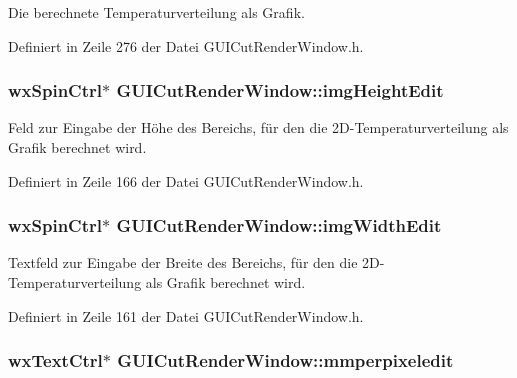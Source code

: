 Die berechnete Temperaturverteilung als Grafik. 



Definiert in Zeile 276 der Datei G\-U\-I\-Cut\-Render\-Window.\-h.

\hypertarget{classGUICutRenderWindow_a4daa569840f00756e6781ad2d87aef5b}{
\subsubsection[{img\-Height\-Edit}]{\setlength{\rightskip}{0pt plus 5cm}wx\-Spin\-Ctrl$\ast$ G\-U\-I\-Cut\-Render\-Window\-::img\-Height\-Edit\hspace{0.3cm}{\ttfamily [private]}}}\label{classGUICutRenderWindow_a4daa569840f00756e6781ad2d87aef5b}


Feld zur Eingabe der Höhe des Bereichs, für den die 2\-D-\/\-Temperaturverteilung als Grafik berechnet wird. 



Definiert in Zeile 166 der Datei G\-U\-I\-Cut\-Render\-Window.\-h.

\hypertarget{classGUICutRenderWindow_a211043ba4bd60862a9fbfe1186c40875}{
\subsubsection[{img\-Width\-Edit}]{\setlength{\rightskip}{0pt plus 5cm}wx\-Spin\-Ctrl$\ast$ G\-U\-I\-Cut\-Render\-Window\-::img\-Width\-Edit\hspace{0.3cm}{\ttfamily [private]}}}\label{classGUICutRenderWindow_a211043ba4bd60862a9fbfe1186c40875}


Textfeld zur Eingabe der Breite des Bereichs, für den die 2\-D-\/\-Temperaturverteilung als Grafik berechnet wird. 



Definiert in Zeile 161 der Datei G\-U\-I\-Cut\-Render\-Window.\-h.

\hypertarget{classGUICutRenderWindow_a76ced7f0bb7a2b08142aaf225f37c108}{
\subsubsection[{mmperpixeledit}]{\setlength{\rightskip}{0pt plus 5cm}wx\-Text\-Ctrl$\ast$ G\-U\-I\-Cut\-Render\-Window\-::mmperpixeledit\hspace{0.3cm}{\ttfamily [private]}}}\label{classGUICutRenderWindow_a76ced7f0bb7a2b08142aaf225f37c108}


